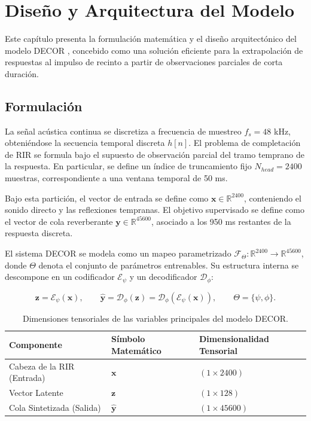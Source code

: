 
\chapter{Diseño y Arquitectura del Modelo}

Este capítulo presenta la formulación matemática y el diseño arquitectónico del modelo DECOR \cite{Lin25}, concebido como una solución eficiente para la extrapolación de respuestas al impulso de recinto a partir de observaciones parciales de corta duración.

\section{Formulación}

La señal acústica continua se discretiza a frecuencia de muestreo $f_s=48$ kHz, obteniéndose la secuencia temporal discreta $h[n]$. El problema de completación de RIR se formula bajo el supuesto de observación parcial del tramo temprano de la respuesta. En particular, se define un índice de truncamiento fijo $N_{head}=2400$ muestras, correspondiente a una ventana temporal de 50 ms.

Bajo esta partición, el vector de entrada se define como $\mathbf{x}\in\mathbb{R}^{2400}$, conteniendo el sonido directo y las reflexiones tempranas. El objetivo supervisado se define como el vector de cola reverberante $\mathbf{y}\in\mathbb{R}^{45600}$, asociado a los 950 ms restantes de la respuesta discreta.

El sistema DECOR se modela como un mapeo parametrizado
$\mathcal{F}_{\Theta}:\mathbb{R}^{2400}\rightarrow\mathbb{R}^{45600}$,
donde $\Theta$ denota el conjunto de parámetros entrenables. Su estructura interna se descompone en un codificador $\mathcal{E}_{\psi}$ y un decodificador $\mathcal{D}_{\phi}$:

\begin{equation}
\mathbf{z}=\mathcal{E}_{\psi}(\mathbf{x}),
\qquad
\hat{\mathbf{y}}=\mathcal{D}_{\phi}(\mathbf{z})=\mathcal{D}_{\phi}(\mathcal{E}_{\psi}(\mathbf{x})),
\qquad
\Theta=\{\psi,\phi\}.
\end{equation}

\begin{table}[htbp]
\centering
\caption{Dimensiones tensoriales de las variables principales del modelo DECOR.}
\label{tab:dimensiones}
\begin{tabular}{lll}
\toprule
\textbf{Componente} & \textbf{Símbolo Matemático} & \textbf{Dimensionalidad Tensorial} \\
\midrule
Cabeza de la RIR (Entrada) & $\mathbf{x}$ & $(1 \times 2400)$ \\
Vector Latente & $\mathbf{z}$ & $(1 \times 128)$ \\
Cola Sintetizada (Salida) & $\hat{\mathbf{y}}$ & $(1 \times 45600)$ \\
\bottomrule
\end{tabular}
\end{table}

